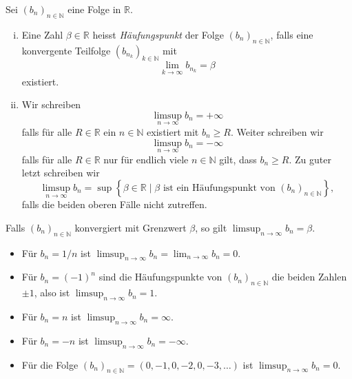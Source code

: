 \documentclass[../main.tex]{subfiles}
\begin{document}
\begin{definition}
  Sei ${(b_{n})}_{n \in \mathbb{N}}$ eine Folge in $\mathbb{R}$.
  \begin{enumerate}[(i)]
    \item Eine Zahl $\beta \in \mathbb{R}$ heisst
      \emph{Häufungspunkt} der Folge ${(b_{n})}_{n \in \mathbb{N}}$, falls eine
      konvergente Teilfolge ${(b_{n_k})}_{k \in \mathbb{N}}$
      mit
      \[
        \lim_{k \to \infty}b_{n_k} = \beta
      \]
      existiert.
    \item Wir schreiben
      \[
        \limsup_{n \to \infty} b_n = +\infty
      \]
      falls für alle $R \in \mathbb{R}$ ein $n \in \mathbb{N}$ existiert
      mit $b_n \geq R$.
      Weiter schreiben wir
      \[
        \limsup_{n \to \infty} b_n = -\infty
      \]
      falls für alle $R \in \mathbb{R}$ nur für endlich viele $n \in \mathbb{N}$ gilt,
      dass
      $b_n \geq R$.
      Zu guter letzt schreiben wir
      \[
        \limsup_{n \to \infty} b_n = \sup \left\{\beta \in \mathbb{R} \mid 
        \beta \text{ ist ein Häufungspunkt von ${(b_{n})}_{n \in \mathbb{N}}$}\right\},
      \]
      falls die beiden oberen Fälle nicht zutreffen.
  \end{enumerate}
\end{definition}

\begin{remark}
  Falls ${(b_{n})}_{n \in \mathbb{N}}$ konvergiert mit Grenzwert $\beta$, so
  gilt
  \(
    \limsup_{n \to \infty} b_n = \beta.
  \)
\end{remark}

\begin{examples}
  \leavevmode
  \begin{itemize}
    \item Für $b_n = 1/n$ ist
      \(
        \limsup_{n \to \infty} b_n = \lim_{n \to \infty} b_n = 0.
      \)
    \item Für $b_n = {(-1)}^n$ sind die Häufungspunkte von
      ${(b_{n})}_{n \in \mathbb{N}}$ die beiden Zahlen $\pm 1$, also ist
      \(
        \limsup_{n \to \infty} b_n = 1.
      \)
    \item Für $b_n = n$ ist
      \(
        \limsup_{n \to \infty} b_n = \infty.
      \)
    \item Für $b_n = -n$ ist
      \(
        \limsup_{n \to \infty} b_n = -\infty.
      \)
    \item Für die Folge ${(b_{n})}_{n \in \mathbb{N}} = (0, -1, 0, -2, 0, -3, \dots)$ ist
      \(
        \limsup_{n \to \infty} b_n = 0.
      \)
  \end{itemize}
\end{examples}
\end{document}
